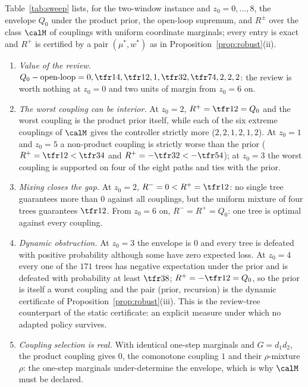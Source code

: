 \begin{example}\label{ex:sweep}
Table~\ref{tab:sweep} lists, for the two-window instance and $z_0=0,\dots,8$, the envelope $Q_0$ under the product prior, the open-loop supremum, and $R^\pm$ over the class $\calM$ of couplings with uniform coordinate marginals; every entry is exact and $R^+$ is certified by a pair $(\mu^\ast,w^\ast)$ as in Proposition~\ref{prop:robust}(ii).
\begin{enumerate}[leftmargin=1.6em,itemsep=1pt]
\item \emph{Value of the review.} $Q_0-\text{open-loop}=0,\tfr14,\tfr12,1,\tfr32,\tfr74,2,2,2$: the review is worth nothing at $z_0=0$ and two units of margin from $z_0=6$ on.
\item \emph{The worst coupling can be interior.} At $z_0=2$, $R^+=\tfr12=Q_0$ and the worst coupling is the product prior itself, while each of the six extreme couplings of $\calM$ gives the controller strictly more ($2,2,1,2,1,2$). At $z_0=1$ and $z_0=5$ a non-product coupling is strictly worse than the prior ($R^+=\tfr12<\tfr34$ and $R^+=-\tfr32<-\tfr54$); at $z_0=3$ the worst coupling is supported on four of the eight paths and ties with the prior.
\item \emph{Mixing closes the gap.} At $z_0=2$, $R^-=0<R^+=\tfr12$: no single tree guarantees more than $0$ against all couplings, but the uniform mixture of four trees guarantees $\tfr12$. From $z_0=6$ on, $R^-=R^+=Q_0$: one tree is optimal against every coupling.
\item \emph{Dynamic obstruction.} At $z_0=3$ the envelope is $0$ and every tree is defeated with positive probability although some have zero expected loss. At $z_0=4$ every one of the $171$ trees has negative expectation under the prior and is defeated with probability at least $\tfr38$; $R^+=-\tfr12=Q_0$, so the prior is itself a worst coupling and the pair (prior, recursion) is the dynamic certificate of Proposition~\ref{prop:robust}(iii). This is the review-tree counterpart of the static certificate: an explicit measure under which no adapted policy survives.
\item \emph{Coupling selection is real.} With identical one-step marginals and $G=d_1d_2$, the product coupling gives $0$, the comonotone coupling $1$ and their $\rho$-mixture $\rho$: the one-step marginals under-determine the envelope, which is why $\calM$ must be declared.
\end{enumerate}
\end{example}

